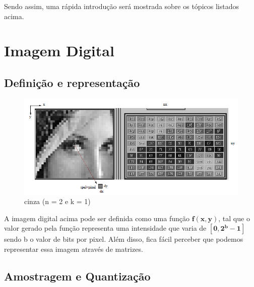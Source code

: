 \documentclass[12pt, a4paper]{article}
\begin{document}
    Sendo assim, uma rápida introdução será mostrada sobre os tópicos listados acima.
    
    \newpage
    
    \section{Imagem Digital}
    	
        \subsection{Definição e representação}
        
    \begin{figure}[!htb]
    	\centering
    	\includegraphics{Screenshot_1}
    	\caption{ cinza (n = 2 e k = 1)}
    	\label{figRotulo}
  	\end{figure}
     \vspace{3mm}
     A imagem digital acima pode ser definida como uma função $\mathbf{f(x,y)}$, tal que o valor gerado pela função representa uma intensidade que varia de $\mathbf{[0, 2^b-1]}$ sendo b o valor de bits por pixel. Além disso, fica fácil perceber que podemos representar essa imagem através de matrizes.
     
    	\subsection{Amostragem e Quantização}
       	
\end{document}
